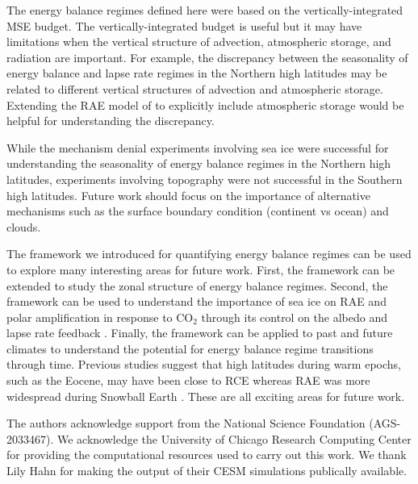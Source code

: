 \documentclass{ametsocV5}
\begin{document}
The energy balance regimes defined here were based on the vertically-integrated MSE budget. The vertically-integrated budget is useful but it may have limitations when the vertical structure of advection, atmospheric storage, and radiation are important. For example, the discrepancy between the seasonality of energy balance and lapse rate regimes in the Northern high latitudes may be related to different vertical structures of advection and atmospheric storage. Extending the RAE model of \cite{cronin2016} to explicitly include atmospheric storage would be helpful for understanding the discrepancy. 

While the mechanism denial experiments involving sea ice were successful for understanding the seasonality of energy balance regimes in the Northern high latitudes, experiments involving topography were not successful in the Southern high latitudes. Future work should focus on the importance of alternative mechanisms such as the surface boundary condition (continent vs ocean) and clouds.

The framework we introduced for quantifying energy balance regimes can be used to explore many interesting areas for future work. First, the framework can be extended to study the zonal structure of energy balance regimes. Second, the framework can be used to understand the importance of sea ice on RAE and polar amplification in response to CO$_2$ through its control on the albedo and lapse rate feedback \citep{feldl2020}. Finally, the framework can be applied to past and future climates to understand the potential for energy balance regime transitions through time. Previous studies suggest that high latitudes during warm epochs, such as the Eocene, may have been close to RCE \citep{abbot2008a} whereas RAE was more widespread during Snowball Earth \citep{pierrehumbert2005}. These are all exciting areas for future work.

\acknowledgments
The authors acknowledge support from the National Science Foundation (AGS-2033467). We acknowledge the University of Chicago Research Computing Center for providing the computational resources used to carry out this work. We thank Lily Hahn for making the output of their CESM simulations publically available.
\end{document}
